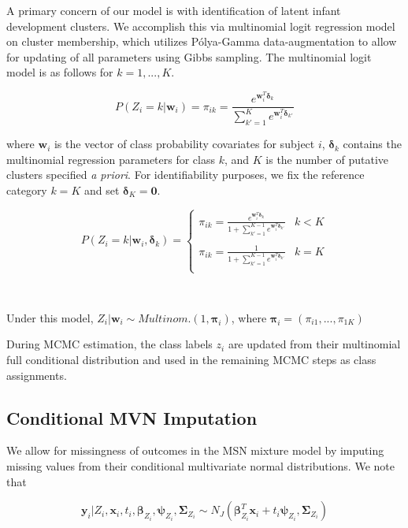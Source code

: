 \documentclass[useAMS,referee]{biom}
\begin{document}
A primary concern of our model is with identification of latent infant development clusters. We accomplish this via multinomial logit regression model on cluster membership, which utilizes P\'{o}lya-Gamma data-augmentation to allow for updating of all parameters using Gibbs sampling. The multinomial logit model is as follows for $k = 1,...,K$.

$$P(Z_i = k|\mathbf{w}_i) = \pi_{ik} = \frac{e^{\mathbf{w}_i^T \boldsymbol\delta_k}}{\sum_{k' = 1}^K e^{\mathbf{w}_i^T \boldsymbol\delta_{k'}}}$$

where $\mathbf{w}_i$ is the vector of class probability covariates for subject $i$, $\boldsymbol\delta_k$ contains the multinomial regression parameters for class $k$, and $K$ is the number of putative clusters specified \textit{a priori}. For identifiability purposes, we fix the reference category $k = K$ and set $\boldsymbol\delta_K = \mathbf{0}$.

\[   P(Z_i = k|\mathbf{w}_i,\boldsymbol\delta_k) = \left \{
\begin{array}{ll}
      \pi_{ik} = \frac{e^{\mathbf{w}_i^T \boldsymbol\delta_k}}{1 + \sum_{k' = 1}^{K-1} e^{\mathbf{w}_i^T \boldsymbol\delta_{k'}}} & k < K \\
      \\
      \pi_{ik} = \frac{1}{1 + \sum_{k' = 1}^{K-1} e^{\mathbf{w}_i^T \boldsymbol\delta_{k'}}} & k = K \\
\end{array} 
\right. \]

\

Under this model, $Z_i|\mathbf{w}_i \sim Multinom.(1,\boldsymbol\pi_i)$, where $\boldsymbol\pi_i = (\pi_{i1},...,\pi_{1K})$

During MCMC estimation, the class labels $z_i$ are updated from their multinomial full conditional distribution and used in the remaining MCMC steps as class assignments.

\subsection{Conditional MVN Imputation}

We allow for missingness of outcomes in the MSN mixture model by imputing missing values from their conditional multivariate normal distributions. We note that

$$\mathbf{y}_i|Z_i,\mathbf{x}_i,t_i,\boldsymbol\beta_{Z_i},\boldsymbol\psi_{Z_i},\boldsymbol\Sigma_{Z_i} \sim N_J(\boldsymbol\beta_{Z_i}^T\mathbf{x}_i  + t_i \boldsymbol\psi_{Z_i}, \boldsymbol\Sigma_{Z_i})$$
\end{document}
